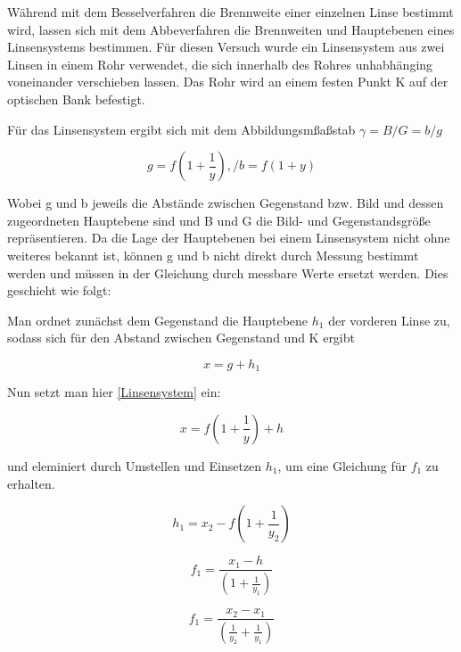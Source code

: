Während mit dem Besselverfahren die Brennweite einer einzelnen Linse bestimmt wird, lassen sich mit dem Abbeverfahren die Brennweiten und Hauptebenen eines Linsensystems bestimmen.
Für diesen Versuch wurde ein Linsensystem aus zwei Linsen in einem Rohr verwendet, die sich innerhalb des Rohres unhabhänging voneinander verschieben lassen.
Das Rohr wird an einem festen Punkt K auf der optischen Bank befestigt.

Für das Linsensystem ergibt sich mit dem Abbildungsmßaßstab $\gamma = B/G = b/g$

\begin{equation} \label{Linsensystem}
    g = f(1 + \frac{1}{y}),/ b = f(1+y)
\end{equation}

Wobei g und b jeweils die Abstände zwischen Gegenstand bzw. Bild und dessen zugeordneten Hauptebene sind und B und G die Bild- und Gegenstandsgröße repräsentieren.
Da die Lage der Hauptebenen bei einem Linsensystem nicht ohne weiteres bekannt ist, können g und b nicht direkt durch Messung bestimmt werden und müssen in der Gleichung
durch messbare Werte ersetzt werden.
Dies geschieht wie folgt:

Man ordnet zunächst dem Gegenstand die Hauptebene $h_1$ der vorderen Linse zu, sodass sich für den Abstand zwischen Gegenstand und K ergibt

\begin{equation} \label{x1}
    x = g + h_1
\end{equation}

Nun setzt man hier \ref{Linsensystem} ein:

\begin{equation} \label{x2}
    x = f(1 + \frac{1}{y}) + h
\end{equation}

und eleminiert durch Umstellen und Einsetzen $h_1$, um eine Gleichung für $f_1$ zu erhalten.

\begin{equation} \label{1}
    h_1 = x_2 - f(1 + \frac{1}{y_2})
\end{equation}

\begin{equation} \label{3}
    f_1 = \frac{x_1 - h}{(1 + \frac{1}{y_1})}
\end{equation}

\begin{equation} \label{4}
    f_1 = \frac{x_2 - x_1}{(\frac{1}{y_2} + \frac{1}{y_1})}
\end{equation}

